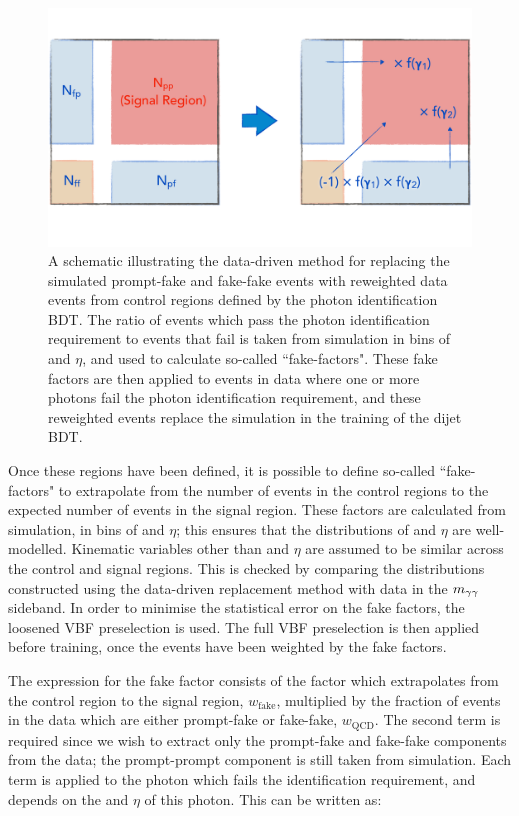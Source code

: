 \begin{figure}
  \centering
  \includegraphics[width=\textwidth]{Figures/Categorisation/DDschematic.pdf}
  \caption[The data-driven method for dijet BDT training.]
  {
    A schematic illustrating the data-driven method for replacing the simulated
    prompt-fake and fake-fake events with reweighted data events from control regions 
    defined by the photon identification BDT. 
    The ratio of events which pass the photon identification requirement to events that fail 
    is taken from simulation in bins of \pt and $\eta$, 
    and used to calculate so-called ``fake-factors". 
    These fake factors are then applied to events in data where one or more photons fail 
    the photon identification requirement, 
    and these reweighted events replace the simulation in the training of the dijet BDT.
  }
  \label{fig:cat_DDschematic}
\end{figure}

Once these regions have been defined, it is possible to define so-called ``fake-factors" 
to extrapolate from the number of events in the control regions 
to the expected number of events in the signal region.
These factors are calculated from simulation, in bins of \pt and $\eta$; 
this ensures that the distributions of \pt and $\eta$ are well-modelled.
Kinematic variables other than \pt and $\eta$ are assumed to be similar 
across the control and signal regions.
This is checked by comparing the distributions constructed using the data-driven replacement 
method with data in the $m_{\gamma\gamma}$ sideband.
In order to minimise the statistical error on the fake factors, 
the loosened VBF preselection is used.
The full VBF preselection is then applied before training, 
once the events have been weighted by the fake factors.

The expression for the fake factor consists of the factor 
which extrapolates from the control region to the signal region, $w_{\textrm{fake}}$, 
multiplied by the fraction of events in the data which are either prompt-fake or fake-fake, 
$w_{\textrm{QCD}}$.
The second term is required since we wish to extract 
only the prompt-fake and fake-fake components from the data;
the prompt-prompt component is still taken from simulation.
Each term is applied to the photon which fails the identification requirement, 
and depends on the \pt and $\eta$ of this photon.
This can be written as:

